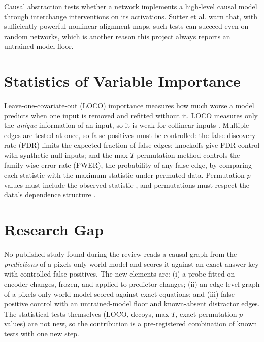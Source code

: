 \documentclass[11pt, a4paper, oneside,enumerate,textcomp]{report}
\begin{document}
Causal abstraction \cite{geiger2025causal} tests whether a network implements a high-level causal model through interchange interventions on its activations. Sutter et al. \cite{sutter2025nonlinear} warn that, with sufficiently powerful nonlinear alignment maps, such tests can succeed even on random networks, which is another reason this project always reports an untrained-model floor.

\section{Statistics of Variable Importance}

Leave-one-covariate-out (LOCO) importance \cite{lei2018loco} measures how much worse a model predicts when one input is removed and refitted without it. LOCO measures only the \emph{unique} information of an input, so it is weak for collinear inputs \cite{verdinelli2024decorrelated}. Multiple edges are tested at once, so false positives must be controlled: the false discovery rate (FDR) \cite{benjamini1995fdr} limits the expected fraction of false edges; knockoffs \cite{barber2015knockoff,candes2018panning} give FDR control with synthetic null inputs; and the max-$T$ permutation method \cite{westfall1993resampling,nichols2002nonparametric} controls the family-wise error rate (FWER), the probability of any false edge, by comparing each statistic with the maximum statistic under permuted data. Permutation $p$-values must include the observed statistic \cite{phipson2010permutation}, and permutations must respect the data's dependence structure \cite{winkler2014permutation}.

\section{Research Gap}

No published study found during the review reads a causal graph from the \emph{predictions} of a pixels-only world model and scores it against an exact answer key with controlled false positives. The new elements are: (i) a probe fitted on encoder changes, frozen, and applied to predictor changes; (ii) an edge-level graph of a pixels-only world model scored against exact equations; and (iii) false-positive control with an untrained-model floor and known-absent distractor edges. The statistical tests themselves (LOCO, decoys, max-$T$, exact permutation $p$-values) are not new, so the contribution is a pre-registered combination of known tests with one new step.
\end{document}
